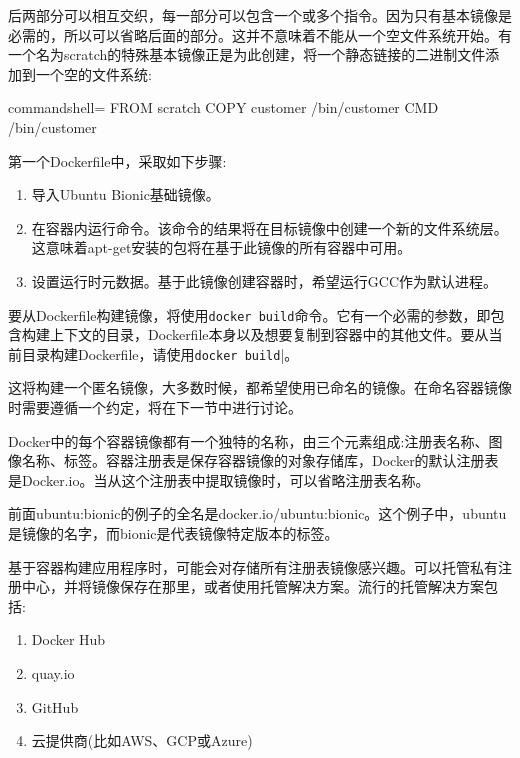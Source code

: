 后两部分可以相互交织，每一部分可以包含一个或多个指令。因为只有基本镜像是必需的，所以可以省略后面的部分。这并不意味着不能从一个空文件系统开始。有一个名为scratch的特殊基本镜像正是为此创建，将一个静态链接的二进制文件添加到一个空的文件系统:

\begin{tcblisting}{commandshell={}}
FROM scratch
COPY customer /bin/customer
CMD /bin/customer
\end{tcblisting}

第一个Dockerfile中，采取如下步骤:

\begin{enumerate}
\item 
导入Ubuntu Bionic基础镜像。

\item
在容器内运行命令。该命令的结果将在目标镜像中创建一个新的文件系统层。这意味着apt-get安装的包将在基于此镜像的所有容器中可用。

\item
设置运行时元数据。基于此镜像创建容器时，希望运行GCC作为默认进程。
\end{enumerate}

要从Dockerfile构建镜像，将使用\texttt{docker build}命令。它有一个必需的参数，即包含构建上下文的目录，Dockerfile本身以及想要复制到容器中的其他文件。要从当前目录构建Dockerfile，请使用\texttt{docker build}|。

这将构建一个匿名镜像，大多数时候，都希望使用已命名的镜像。在命名容器镜像时需要遵循一个约定，将在下一节中进行讨论。


Docker中的每个容器镜像都有一个独特的名称，由三个元素组成:注册表名称、图像名称、标签。容器注册表是保存容器镜像的对象存储库，Docker的默认注册表是Docker.io。当从这个注册表中提取镜像时，可以省略注册表名称。

前面ubuntu:bionic的例子的全名是docker.io/ubuntu:bionic。这个例子中，ubuntu是镜像的名字，而bionic是代表镜像特定版本的标签。

基于容器构建应用程序时，可能会对存储所有注册表镜像感兴趣。可以托管私有注册中心，并将镜像保存在那里，或者使用托管解决方案。流行的托管解决方案包括:

\begin{enumerate}
\item 
Docker Hub

\item 
quay.io

\item 
GitHub

\item 
云提供商(比如AWS、GCP或Azure)
\end{enumerate}

